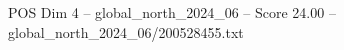 \begin{textsample}{POS Dim 4 – global\_north\_2024\_06 – Score 24.00 – global\_north\_2024\_06/200528455.txt}
\end{textsample}
